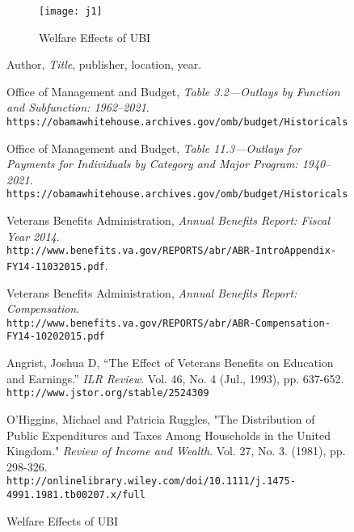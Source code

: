 \documentclass{article}
\begin{document}
\begin{figure}[H]
\begin{figure}[H]
\centering
\caption{Welfare Effects of UBI}
\texttt{[image: j1]}
\end{figure}



\newpage
\begin{thebibliography}{1}

 Author, \textit{Title}, publisher, location, year.

 Office of Management and Budget, \textit{Table 3.2—Outlays by Function and Subfunction: 1962–2021}.\\ \texttt{https://obamawhitehouse.archives.gov/omb/budget/Historicals}

 Office of Management and Budget, \textit{Table 11.3—Outlays for Payments for Individuals by Category and Major Program: 1940–2021}.\\ \texttt{https://obamawhitehouse.archives.gov/omb/budget/Historicals}

 Veterans Benefits Administration, \textit{Annual Benefits Report: Fiscal Year 2014}.\\ \texttt{http://www.benefits.va.gov/REPORTS/abr/ABR-IntroAppendix-FY14-11032015.pdf}.

 Veterans Benefits Administration, \textit{Annual Benefits Report: Compensation}.\\ \texttt{http://www.benefits.va.gov/REPORTS/abr/ABR-Compensation-FY14-10202015.pdf}

 Angrist, Joshua D, “The Effect of Veterans Benefits on Education and Earnings.” \textit{ILR Review}. Vol. 46, No. 4 (Jul., 1993), pp. 637-652.\\ \texttt{http://www.jstor.org/stable/2524309}

 O'Higgins, Michael and Patricia Ruggles, "The Distribution of Public Expenditures and Taxes Among Households in the United Kingdom." \textit{Review of Income and Wealth}. Vol. 27, No. 3. (1981), pp. 298-326.\\ \texttt{http://onlinelibrary.wiley.com/doi/10.1111/j.1475-4991.1981.tb00207.x/full}


\end{thebibliography}
\end{figure}
\end{document}
